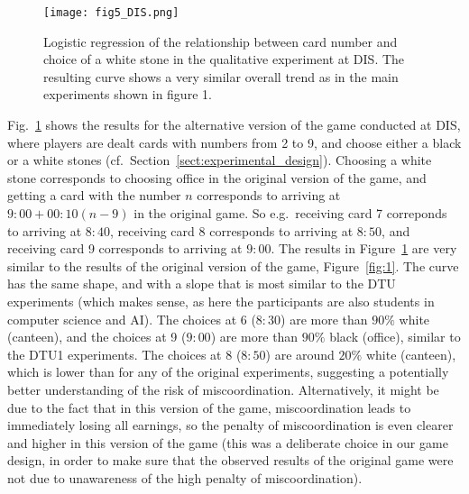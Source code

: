 \begin{figure} %
  \centering\texttt{[image: fig5\_DIS.png]}
  \caption{Logistic regression of the relationship between card number and choice of a white stone in the qualitative experiment at DIS. The resulting curve shows a very similar overall trend as in the main experiments shown in figure 1.}
  \label{fig:dis}
  \end{figure}  
Fig.~\ref{fig:dis} shows the results for the alternative version of the game conducted at DIS, where players are dealt cards with numbers from 2 to 9, and choose either a black or a white stones (cf.\ Section~\ref{sect:experimental_design}). Choosing a white stone corresponds to choosing office in the original version of the game, and getting a card with the number $n$ corresponds to arriving at $9{:}00+00{:}10(n-9)$ in the original game. So e.g.\ receiving card 7 correponds to arriving at $8{:}40$, receiving card 8 corresponds to arriving at $8{:}50$, and receiving card 9 corresponds to arriving at $9{:}00$. The results in Figure~\ref{fig:dis} are very similar to the results of the original version of the game, Figure~\ref{fig:1}. The curve has the same shape, and with a slope that is most similar to the DTU experiments (which makes sense, as here the participants are also students in computer science and AI). The choices at 6 ($8{:}30$) are more than $90\%$ white (canteen), and the choices at 9 ($9{:}00$) are more than $90\%$ black (office), similar to the DTU1 experiments. The choices at 8 ($8{:}50$) are around $20\%$ white (canteen), which is lower than for any of the original experiments, suggesting a potentially better understanding of the risk of miscoordination. Alternatively, it might be due to the fact that in this version of the game, miscoordination leads to immediately losing all earnings, so the penalty of miscoordination is even clearer and higher in this version of the game (this was a deliberate choice in our game design, in order to make sure that the observed results of the original game were not due to unawareness of the high penalty of miscoordination).%

